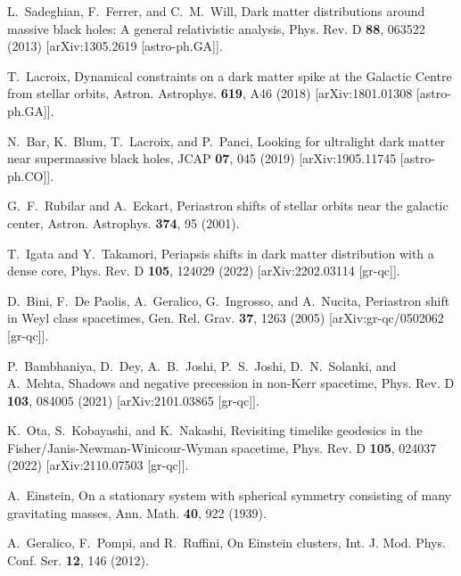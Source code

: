\documentclass[aps,11pt,nofootinbib,preprintnumbers,groupedaddress,superscriptaddress]{revtex4-2}
\begin{document}
\begin{thebibliography}{99}
%
L.~Sadeghian, F.~Ferrer, and C.~M.~Will,
Dark matter distributions around massive black holes: A general relativistic analysis,
Phys. Rev. D \textbf{88}, %
063522 (2013)
[arXiv:1305.2619 [astro-ph.GA]].

%
T.~Lacroix,
Dynamical constraints on a dark matter spike at the Galactic Centre from stellar orbits,
Astron. Astrophys. \textbf{619}, A46 (2018)
[arXiv:1801.01308 [astro-ph.GA]].

N.~Bar, K.~Blum, T.~Lacroix, and P.~Panci,
Looking for ultralight dark matter near supermassive black holes,
JCAP \textbf{07}, 045 (2019)
[arXiv:1905.11745 [astro-ph.CO]].

%
G.~F.~Rubilar and A.~Eckart,
Periastron shifts of stellar orbits near the galactic center,
Astron. Astrophys. \textbf{374}, 95 (2001). 

%
T.~Igata and Y.~Takamori,
Periapsis shifts in dark matter distribution with a dense core,
Phys. Rev. D \textbf{105}, %
124029 (2022)
[arXiv:2202.03114 [gr-qc]].


%
D.~Bini, F.~De Paolis, A.~Geralico, G.~Ingrosso, and A.~Nucita,
Periastron shift in Weyl class spacetimes,
Gen. Rel. Grav. \textbf{37}, 1263 (2005)
[arXiv:gr-qc/0502062 [gr-qc]].

%
P.~Bambhaniya, D.~Dey, A.~B.~Joshi, P.~S.~Joshi, D.~N.~Solanki, and A.~Mehta,
Shadows and negative precession in non-Kerr spacetime,
Phys. Rev. D \textbf{103}, 084005 (2021)
[arXiv:2101.03865 [gr-qc]].

%
K.~Ota, S.~Kobayashi, and K.~Nakashi,
Revisiting timelike geodesics in the Fisher/Janis-Newman-Winicour-Wyman spacetime,
Phys. Rev. D \textbf{105}, 024037 (2022)
[arXiv:2110.07503 [gr-qc]].

%
A.~Einstein,
On a stationary system with spherical symmetry consisting of many gravitating masses, 
Ann. Math. \textbf{40}, 922 (1939).

%
A.~Geralico, F.~Pompi, and R.~Ruffini,
On Einstein clusters,
Int. J. Mod. Phys. Conf. Ser. \textbf{12}, 146 (2012).


\end{thebibliography}
\end{document}

